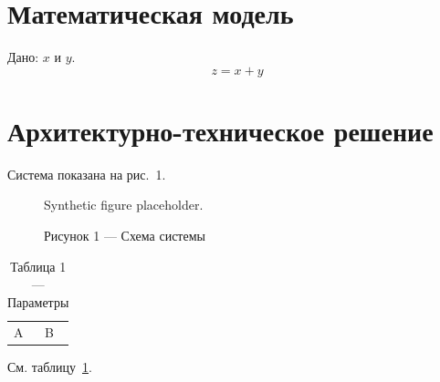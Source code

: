 \documentclass{gostcheck-vkr}
\begin{document}
\section{Математическая модель}
Дано: $x$ и $y$.
\begin{equation}
z = x + y
\end{equation}
\section{Архитектурно-техническое решение}
Система показана на рис.~1.
\begin{figure}
\centering
Synthetic figure placeholder.
\caption{Рисунок 1 — Схема системы}
\label{fig:demo}
\end{figure}
\begin{table}
\caption{Таблица 1 — Параметры}
\label{tab:demo}
\begin{tabular}{ll}
A & B \\
\end{tabular}
\end{table}
См. таблицу~\ref{tab:demo}.
\end{document}
